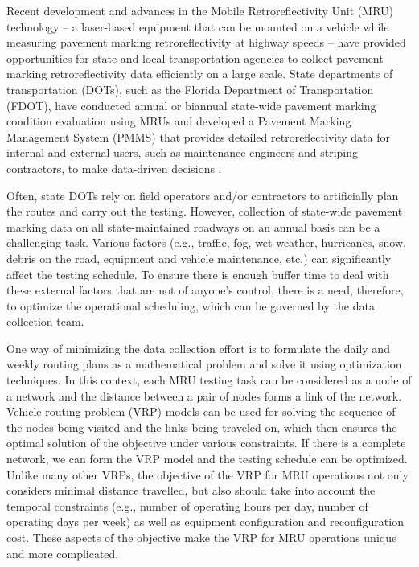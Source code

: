 \documentclass[numbered]{trbunofficial}
\begin{document}
Recent development and advances in the Mobile Retroreflectivity Unit (MRU) technology -- a laser-based equipment that can be mounted on a vehicle while measuring pavement marking retroreflectivity at highway speeds -- have provided opportunities for state and local transportation agencies to collect pavement marking retroreflectivity data efficiently on a large scale.  State departments of transportation (DOTs), such as the Florida Department of Transportation (FDOT), have conducted annual or biannual state-wide pavement marking condition evaluation using MRUs and developed a Pavement Marking Management System (PMMS) that provides detailed retroreflectivity data for internal and external users, such as maintenance engineers and striping contractors, to make data-driven decisions \cite{Choubane2018,pmms}.  

Often, state DOTs rely on field operators and/or contractors to artificially plan the routes and carry out the testing.  However, collection of state-wide pavement marking data on all state-maintained roadways on an annual basis can be a challenging task.  Various factors (e.g., traffic, fog, wet weather, hurricanes, snow, debris on the road, equipment and vehicle maintenance, etc.) can significantly affect the testing schedule.  To ensure there is enough buffer time to deal with these external factors that are not of anyone's control, there is a need, therefore, to optimize the operational scheduling, which can be governed by the data collection team.

One way of minimizing the data collection effort is to formulate the daily and weekly routing plans as a mathematical problem and solve it using optimization techniques.  In this context, each MRU testing task can be considered as a node of a network and the distance between a pair of nodes forms a link of the network.  Vehicle routing problem (VRP) models can be used for solving the sequence of the nodes being visited and the links being traveled on, which then ensures the optimal solution of the objective under various constraints. If there is a complete network, we can form the VRP model and the testing schedule can be optimized.  Unlike many other VRPs, the objective of the VRP for MRU operations not only considers minimal distance travelled, but also should take into account the temporal constraints (e.g., number of operating hours per day, number of operating days per week) as well as equipment configuration and reconfiguration cost.  These aspects of the objective make the VRP for MRU operations unique and more complicated.
\end{document}
